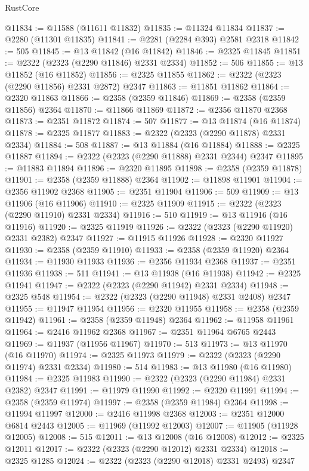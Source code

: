 \begin{lexlean}{RustCore}
\begin{coremodule}
@11834 := @11588 (@11611 @11832)
@11835 := @11324 @11834
@11837 := @2280 (@11301 @11835)
@11841 := @2281 (@2284 @393) @2581 @2318
@11842 := 505
@11845 := @13 @11842 (@16 @11842)
@11846 := @2325 @11845
@11851 := @2322 (@2323 (@2290 @11846) @2331 @2334)
@11852 := 506
@11855 := @13 @11852 (@16 @11852)
@11856 := @2325 @11855
@11862 := @2322 (@2323 (@2290 @11856) @2331 @2872) @2347
@11863 := @11851 @11862
@11864 := @2320 @11863
@11866 := @2358 (@2359 @11846)
@11869 := @2358 (@2359 @11856) @2364
@11870 := @11866 @11869
@11872 := @2356 @11870 @2368
@11873 := @2351 @11872
@11874 := 507
@11877 := @13 @11874 (@16 @11874)
@11878 := @2325 @11877
@11883 := @2322 (@2323 (@2290 @11878) @2331 @2334)
@11884 := 508
@11887 := @13 @11884 (@16 @11884)
@11888 := @2325 @11887
@11894 := @2322 (@2323 (@2290 @11888) @2331 @2344) @2347
@11895 := @11883 @11894
@11896 := @2320 @11895
@11898 := @2358 (@2359 @11878)
@11901 := @2358 (@2359 @11888) @2364
@11902 := @11898 @11901
@11904 := @2356 @11902 @2368
@11905 := @2351 @11904
@11906 := 509
@11909 := @13 @11906 (@16 @11906)
@11910 := @2325 @11909
@11915 := @2322 (@2323 (@2290 @11910) @2331 @2334)
@11916 := 510
@11919 := @13 @11916 (@16 @11916)
@11920 := @2325 @11919
@11926 := @2322 (@2323 (@2290 @11920) @2331 @2382) @2347
@11927 := @11915 @11926
@11928 := @2320 @11927
@11930 := @2358 (@2359 @11910)
@11933 := @2358 (@2359 @11920) @2364
@11934 := @11930 @11933
@11936 := @2356 @11934 @2368
@11937 := @2351 @11936
@11938 := 511
@11941 := @13 @11938 (@16 @11938)
@11942 := @2325 @11941
@11947 := @2322 (@2323 (@2290 @11942) @2331 @2334)
@11948 := @2325 @548
@11954 := @2322 (@2323 (@2290 @11948) @2331 @2408) @2347
@11955 := @11947 @11954
@11956 := @2320 @11955
@11958 := @2358 (@2359 @11942)
@11961 := @2358 (@2359 @11948) @2364
@11962 := @11958 @11961
@11964 := @2416 @11962 @2368
@11967 := @2351 @11964 @6765 @2443
@11969 := @11937 (@11956 @11967)
@11970 := 513
@11973 := @13 @11970 (@16 @11970)
@11974 := @2325 @11973
@11979 := @2322 (@2323 (@2290 @11974) @2331 @2334)
@11980 := 514
@11983 := @13 @11980 (@16 @11980)
@11984 := @2325 @11983
@11990 := @2322 (@2323 (@2290 @11984) @2331 @2382) @2347
@11991 := @11979 @11990
@11992 := @2320 @11991
@11994 := @2358 (@2359 @11974)
@11997 := @2358 (@2359 @11984) @2364
@11998 := @11994 @11997
@12000 := @2416 @11998 @2368
@12003 := @2351 @12000 @6814 @2443
@12005 := @11969 (@11992 @12003)
@12007 := @11905 (@11928 @12005)
@12008 := 515
@12011 := @13 @12008 (@16 @12008)
@12012 := @2325 @12011
@12017 := @2322 (@2323 (@2290 @12012) @2331 @2334)
@12018 := @2325 @1285
@12024 := @2322 (@2323 (@2290 @12018) @2331 @2493) @2347

\end{coremodule}
\end{lexlean}
